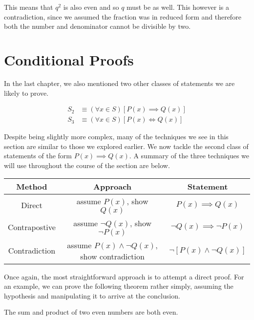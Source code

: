 \documentclass[twoside]{report}
\begin{document}
This means that $q^2$ is also even and so $q$ must be as well. This however is a contradiction, since we assumed the fraction was in reduced form and therefore both the number and denominator cannot be divisible by two.
\vspace{\baselineskip}


\section{Conditional Proofs}

In the last chapter, we also mentioned two other classes of statements we are likely to prove.

\begin{align*}
	S_2 &\equiv (\forall x \in S)[P(x) \implies Q(x)] \\
	S_3 &\equiv (\forall x \in S)[P(x) \iff Q(x)]
\end{align*}

Despite being slightly more complex, many of the techniques we see in this section are similar to those we explored earlier. We now tackle the second class of statements of the form $P(x) \implies Q(x)$. A summary of the three techniques we will use throughout the course of the section are below.

\begin{center}
	\begin{tabular}{ccc}
		\toprule
		Method & Approach & Statement \\
		\midrule
		Direct & assume $P(x)$, show $Q(x)$ & $P(x) \implies Q(x)$ \\
		Contrapostive & assume $\neg Q(x)$, show $\neg P(x)$ & $\neg Q(x) \implies \neg P(x)$ \\
		Contradiction & assume $P(x) \wedge \neg Q(x)$, show contradiction & $\neg[P(x) \wedge \neg Q(x)]$ \\
		\bottomrule
	\end{tabular}
\end{center}
\vspace{\baselineskip}

Once again, the most straightforward approach is to attempt a direct proof. For an example, we can prove the following theorem rather simply, assuming the hypothesis and manipulating it to arrive at the conclusion.

\vspace{\baselineskip}
\begin{theorem}
	The sum and product of two even numbers are both even. 
\end{theorem}
\end{document}
